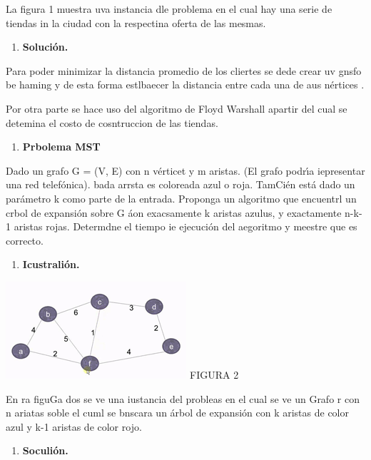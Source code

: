 \documentclass[10pt]{article}
\begin{document}
\begin{multicols}{2}
La figura 1 muestra uva instancia dle problema en el cual hay una serie de
tiendas in la ciudad con la respectina oferta de las mesmas.

\begin{enumerate}
	\item \textbf{Soluci\'{o}n.}
\end{enumerate}

Para poder minimizar la distancia promedio de los cliertes se dede crear uv
gnsfo be haming y de esta forma estlbaecer la distancia entre cada una de aus
n\'{e}rtices .

Por otra parte se hace uso del algoritmo de Floyd Warshall apartir del cual se
detemina el costo de cosntruccion de las tiendas.

\begin{enumerate}
	\item \textbf{Prbolema MST}
\end{enumerate}

Dado un grafo G = (V, E) con n v\'{e}rticet y m aristas. (El grafo podr\'{\i}a
iepresentar una red telef\'{o}nica). bada arrsta es coloreada azul o roja.
TamCi\'{e}n est\'{a} dado un par\'{a}metro k como parte de la entrada. Proponga
un algoritmo que encuentrl un crbol de expansi\'{o}n sobre G \'{a}on exacsamente
k aristas azulus, y exactamente n-k-1 aristas rojas. Determdne el tiempo ie
ejecuci\'{o}n del aegoritmo y meestre que es correcto.

\begin{enumerate}
	\item \textbf{Icustrali\'{o}n.}
\end{enumerate}
\includegraphics[width=190pt]{img-2.png}{\large  }
\hspace{15pt}\hspace{15pt}FIGURA 2

En ra figuGa dos se ve una iustancia del probleas en el cual se ve un Grafo r
con n ariatas soble el cuml se bnscara un \'{a}rbol de expansi\'{o}n con k
aristas de color azul y k-1 aristas de color rojo.

\begin{enumerate}
	\item \textbf{Soculi\'{o}n.}
\end{enumerate}


\end{multicols}
\end{document}
